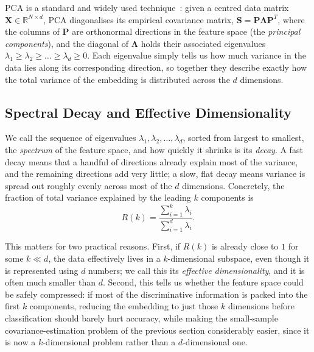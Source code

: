 PCA is a standard and widely used technique~\cite{jolliffe2002principal}: given a centred data matrix $\mathbf{X}\in\mathbb{R}^{N\times d}$, PCA diagonalises its empirical covariance matrix, $\mathbf{S} = \mathbf{P}\boldsymbol{\Lambda}\mathbf{P}^{T}$, where the columns of $\mathbf{P}$ are orthonormal directions in the feature space (the \emph{principal components}), and the diagonal of $\boldsymbol{\Lambda}$ holds their associated eigenvalues $\lambda_1 \ge \lambda_2 \ge \dots \ge \lambda_d \ge 0$. Each eigenvalue simply tells us how much variance in the data lies along its corresponding direction, so together they describe exactly how the total variance of the embedding is distributed across the $d$ dimensions.

\subsection{Spectral Decay and Effective Dimensionality}
\label{sec:gsc:spectral_decay}

We call the sequence of eigenvalues $\lambda_1, \lambda_2, \dots, \lambda_d$, sorted from largest to smallest, the \emph{spectrum} of the feature space, and how quickly it shrinks is its \emph{decay}. A fast decay means that a handful of directions already explain most of the variance, and the remaining directions add very little; a slow, flat decay means variance is spread out roughly evenly across most of the $d$ dimensions. Concretely, the fraction of total variance explained by the leading $k$ components is
\begin{equation}
	R(k) = \frac{\sum_{i=1}^{k}\lambda_i}{\sum_{i=1}^{d}\lambda_i}.
	\label{eq:pca_variance_ratio}
\end{equation}

This matters for two practical reasons. First, if $R(k)$ is already close to $1$ for some $k \ll d$, the data effectively lives in a $k$-dimensional subspace, even though it is represented using $d$ numbers; we call this its \emph{effective dimensionality}, and it is often much smaller than $d$. Second, this tells us whether the feature space could be safely compressed: if most of the discriminative information is packed into the first $k$ components, reducing the embedding to just those $k$ dimensions before classification should barely hurt accuracy, while making the small-sample covariance-estimation problem of the previous section considerably easier, since it is now a $k$-dimensional problem rather than a $d$-dimensional one. 

